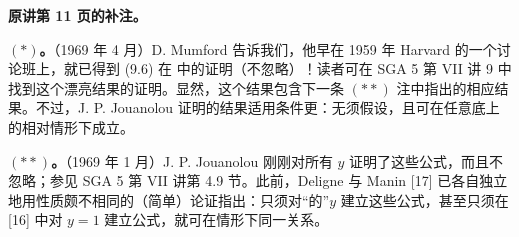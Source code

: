 \textbf{原讲第 11 页的补注。}

\textbf{$(*)$。}（1969 年 4 月）D. Mumford 告诉我们，他早在 1959 年 Harvard 的一个讨论班上，就已得到 (9.6) 在 中的证明（不忽略）！读者可在 SGA 5 第 VII 讲 9 中找到这个漂亮结果的证明。显然，这个结果包含下一条 $(**)$ 注中指出的相应结果。不过，J. P. Jouanolou 证明的结果适用条件更：无须假设，且可在任意底上的相对情形下成立。

\textbf{$(**)$。}（1969 年 1 月）J. P. Jouanolou 刚刚对所有 $y$ 证明了这些公式，而且不忽略；参见 SGA 5 第 VII 讲第 4.9 节。此前，Deligne 与 Manin [17] 已各自独立地用性质颇不相同的（简单）论证指出：只须对“的”$y$ 建立这些公式，甚至只须在 [16] 中对 $y=1$ 建立公式，就可在情形下同一关系。



